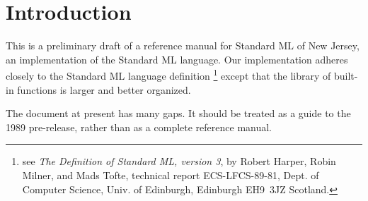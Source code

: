 \chapter{Introduction}

This is a preliminary draft of a reference manual
for Standard ML of New Jersey, an implementation of the Standard ML language.
Our implementation adheres closely to the Standard ML language definition
\footnote{see {\it The Definition of Standard ML, version 3}, by Robert Harper,
Robin Milner, and Mads Tofte, technical report ECS-LFCS-89-81, Dept. of
Computer Science, Univ. of Edinburgh, Edinburgh EH9~3JZ Scotland.}
except that the library of built-in functions is larger and better 
organized.

The document at present has many gaps.  It should be treated
as a guide to the 1989 pre-release, rather than as a complete
reference manual.
